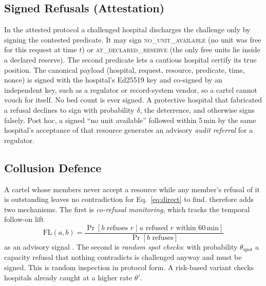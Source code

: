 \subsection{Signed Refusals (Attestation)}
\label{sec:attest}
In the attested protocol a challenged hospital discharges the challenge only by signing the contested predicate. It may sign \textsc{no\_unit\_available} (no unit was free for this request at time $t$) or \textsc{at\_declared\_reserve} (the only free units lie inside a declared reserve). The second predicate lets a cautious hospital certify its true position. The canonical payload (hospital, request, resource, predicate, time, nonce) is signed with the hospital's Ed25519 key \cite{bernstein2012ed25519} and co-signed by an independent key, such as a regulator or record-system vendor, so a cartel cannot vouch for itself. No bed count is ever signed. A protective hospital that fabricated a refusal declines to sign with probability $\delta$, the deterrence, and otherwise signs falsely. Post hoc, a signed ``no unit available'' followed within 5\,min by the same hospital's acceptance of that resource generates an advisory \emph{audit referral} for a regulator.

\subsection{Collusion Defence}
\label{sec:collusion}
A cartel whose members never accept a resource while any member's refusal of it is outstanding leaves no contradiction for Eq.~\eqref{eq:direct} to find. \mahros{} therefore adds two mechanisms. The first is \emph{co-refusal monitoring}, which tracks the temporal follow-on lift
\begin{equation}
  \mathrm{FL}(a,b) = \frac{\Pr[b \text{ refuses } r \mid a \text{ refused } r \text{ within } 60\,\text{min}]}{\Pr[b \text{ refuses}]}
  \label{eq:lift}
\end{equation}
as an advisory signal \cite{porter1993bidrigging}. The second is \emph{random spot checks}: with probability $\theta_{\text{spot}}$ a capacity refusal that nothing contradicts is challenged anyway and must be signed. This is random inspection \cite{becker1968crime} in protocol form. A risk-based variant checks hospitals already caught at a higher rate $\theta'$.

